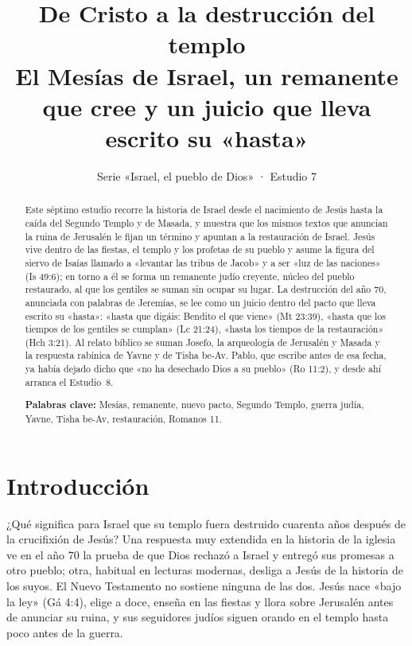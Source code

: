\providecommand{\pt}[2]{({#1-30},{#2-29})}
\title{\color{ladrillo}\bfseries De Cristo a la destrucción del templo\\[4pt]\large\color{cafe}\mdseries El Mesías de Israel, un remanente que cree y un juicio que lleva escrito su «hasta»}
\author{}\date{\color{sepia}Serie «Israel, el pueblo de Dios» · Estudio 7}

\maketitle\thispagestyle{empty}

\begin{abstract}\noindent
Este séptimo estudio recorre la historia de Israel desde el nacimiento de Jesús hasta la caída del Segundo Templo y de Masada, y muestra que los mismos textos que anuncian la ruina de Jerusalén le fijan un término y apuntan a la restauración de Israel. Jesús vive dentro de las fiestas, el templo y los profetas de su pueblo y asume la figura del siervo de Isaías llamado a «levantar las tribus de Jacob» y a ser «luz de las naciones» (Is 49:6); en torno a él se forma un remanente judío creyente, núcleo del pueblo restaurado, al que los gentiles se suman sin ocupar su lugar. La destrucción del año 70, anunciada con palabras de Jeremías, se lee como un juicio dentro del pacto que lleva escrito su «hasta»: «hasta que digáis: Bendito el que viene» (Mt 23:39), «hasta que los tiempos de los gentiles se cumplan» (Lc 21:24), «hasta los tiempos de la restauración» (Hch 3:21). Al relato bíblico se suman Josefo, la arqueología de Jerusalén y Masada y la respuesta rabínica de Yavne y de Tisha be-Av. Pablo, que escribe antes de esa fecha, ya había dejado dicho que «no ha desechado Dios a su pueblo» (Ro 11:2), y desde ahí arranca el Estudio~8.
\par\smallskip\noindent\textbf{Palabras clave:} Mesías, remanente, nuevo pacto, Segundo Templo, guerra judía, Yavne, Tisha be-Av, restauración, Romanos 11.
\end{abstract}

\section{Introducción}

¿Qué significa para Israel que su templo fuera destruido cuarenta años después de la crucifixión de Jesús? Una respuesta muy extendida en la historia de la iglesia ve en el año 70 la prueba de que Dios rechazó a Israel y entregó sus promesas a otro pueblo; otra, habitual en lecturas modernas, desliga a Jesús de la historia de los suyos. El Nuevo Testamento no sostiene ninguna de las dos. Jesús nace «bajo la ley» (Gá 4:4), elige a doce, enseña en las fiestas y llora sobre Jerusalén antes de anunciar su ruina, y sus seguidores judíos siguen orando en el templo hasta poco antes de la guerra.


